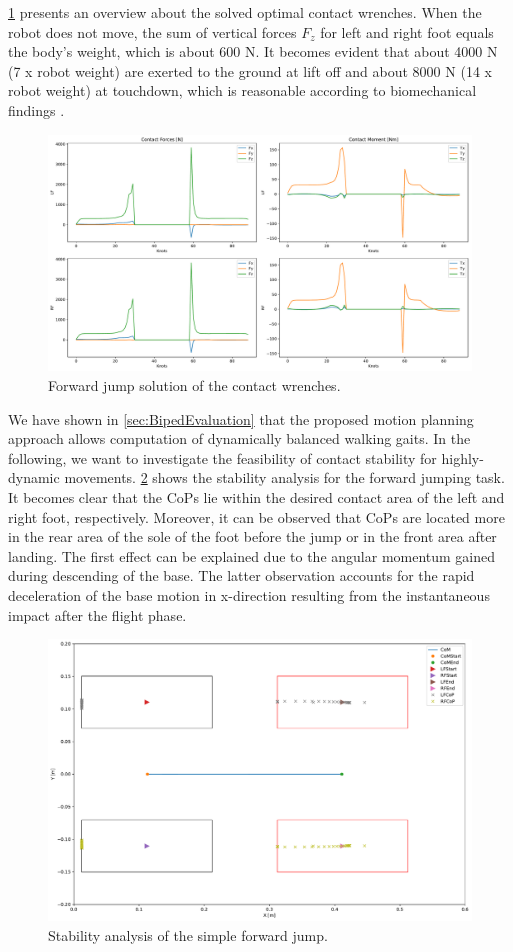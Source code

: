 \cref{fig:jumpForward_ContactWrenches} presents an overview about the solved optimal contact wrenches. When the robot does not move, the sum of vertical forces $F_z$ for left and right foot equals the body's weight, which is about 600 N. It becomes evident that about 4000 N (7 x robot weight) are exerted to the ground at lift off and about 8000 N (14 x robot weight) at touchdown, which is reasonable according to biomechanical findings \cite{meghdari2002dynamical}.
\begin{figure}[h!]
\centering	
\includegraphics[width=1\textwidth]{fig/jumpForward/ContactWrenches}
\caption{Forward jump solution of the contact wrenches.}
\label{fig:jumpForward_ContactWrenches}
\end{figure} 

We have shown in \cref{sec:BipedEvaluation} that the proposed motion planning approach allows computation of dynamically balanced walking gaits. In the following, we want to investigate the feasibility of contact stability for highly-dynamic movements. \cref{fig:jumpForward_StabilityAnalysis} shows the stability analysis for the forward jumping task. It becomes clear that the \gls{CoP}s lie within the desired contact area of the left and right foot, respectively. Moreover, it can be observed that \gls{CoP}s are located more in the rear area of the sole of the foot before the jump or in the front area after landing. The first effect can be explained due to the angular momentum gained during descending of the base. The latter observation accounts for the rapid deceleration of the base motion in x-direction resulting from the instantaneous impact after the flight phase.    
\begin{figure}[h!]
\centering	
\includegraphics[width=.7\textwidth]{fig/jumpForward/StabilityAnalysis}
\caption{Stability analysis of the simple forward jump.}
\label{fig:jumpForward_StabilityAnalysis}
\end{figure} 

